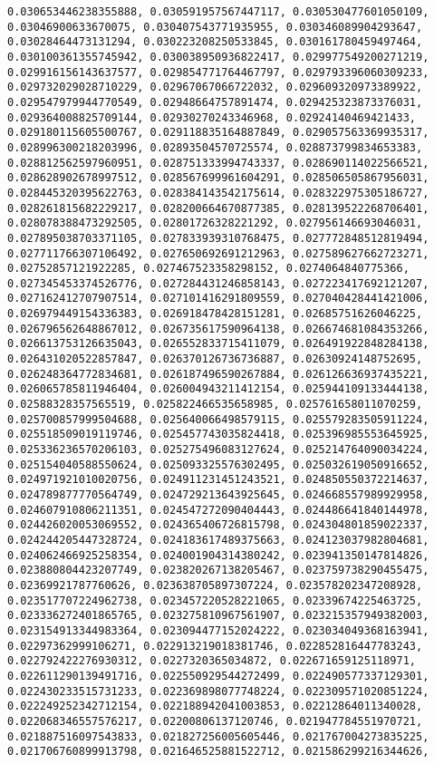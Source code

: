 \documentclass[11pt]{article}
\begin{document}
\begin{Verbatim}[commandchars=\\\{\}]
0.030653446238355888, 0.030591957567447117, 0.030530477601050109, 0.03046900633670075, 0.030407543771935955, 0.030346089904293647, 0.03028464473131294, 0.030223208250533845, 0.030161780459497464, 0.030100361355745942, 0.030038950936822417, 0.029977549200271219, 0.029916156143637577, 0.029854771764467797, 0.029793396060309233, 0.029732029028710229, 0.02967067066722032, 0.029609320973389922, 0.029547979944770549, 0.02948664757891474, 0.029425323873376031, 0.029364008825709144, 0.02930270243346968, 0.02924140469421433, 0.029180115605500767, 0.029118835164887849, 0.029057563369935317, 0.028996300218203996, 0.02893504570725574, 0.028873799834653383, 0.028812562597960951, 0.028751333994743337, 0.028690114022566521, 0.028628902678997512, 0.028567699961604291, 0.028506505867956031, 0.028445320395622763, 0.028384143542175614, 0.028322975305186727, 0.028261815682229217, 0.028200664670877385, 0.028139522268706401, 0.028078388473292505, 0.02801726328221292, 0.027956146693046031, 0.027895038703371105, 0.027833939310768475, 0.027772848512819494, 0.027711766307106492, 0.027650692691212963, 0.027589627662723271, 0.02752857121922285, 0.027467523358298152, 0.0274064840775366, 0.027345453374526776, 0.027284431246858143, 0.027223417692121207, 0.027162412707907514, 0.027101416291809559, 0.027040428441421006, 0.026979449154336383, 0.026918478428151281, 0.02685751626046225, 0.026796562648867012, 0.026735617590964138, 0.026674681084353266, 0.026613753126635043, 0.026552833715411079, 0.026491922848284138, 0.026431020522857847, 0.026370126736736887, 0.02630924148752695, 0.026248364772834681, 0.026187496590267884, 0.026126636937435221, 0.026065785811946404, 0.026004943211412154, 0.025944109133444138, 0.02588328357565519, 0.025822466535658985, 0.025761658011070259, 0.025700857999504688, 0.025640066498579115, 0.025579283505911224, 0.025518509019119746, 0.025457743035824418, 0.025396985553645925, 0.025336236570206103, 0.025275496083127624, 0.025214764090034224, 0.025154040588550624, 0.025093325576302495, 0.025032619050916652, 0.024971921010020756, 0.024911231451243521, 0.024850550372214637, 0.024789877770564749, 0.024729213643925645, 0.024668557989929958, 0.024607910806211351, 0.024547272090404443, 0.024486641840144978, 0.024426020053069552, 0.024365406726815798, 0.024304801859022337, 0.024244205447328724, 0.024183617489375663, 0.024123037982804681, 0.024062466925258354, 0.024001904314380242, 0.023941350147814826, 0.023880804423207749, 0.023820267138205467, 0.023759738290455475, 0.02369921787760626, 0.023638705897307224, 0.023578202347208928, 0.023517707224962738, 0.023457220528221065, 0.02339674225463725, 0.023336272401865765, 0.023275810967561907, 0.023215357949382003, 0.023154913344983364, 0.023094477152024222, 0.023034049368163941, 0.02297362999106271, 0.022913219018381746, 0.022852816447783243, 0.022792422276930312, 0.0227320365034872, 0.022671659125118971, 0.022611290139491716, 0.022550929544272499, 0.022490577337129301, 0.022430233515731233, 0.022369898077748224, 0.022309571020851224, 0.022249252342712154, 0.022188942041003853, 0.02212864011340028, 0.022068346557576217, 0.02200806137120746, 0.021947784551970721, 0.021887516097543833, 0.021827256005605446, 0.021767004273835225, 0.021706760899913798, 0.021646525881522712, 0.021586299216344626, 
\end{Verbatim}
\end{document}
